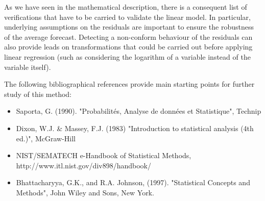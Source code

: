             {
              As we have seen in the mathematical description, there is a consequent list of verifications that have to be carried to validate the linear model. In particular, underlying assumptions on the residuals are important to ensure the robustness of the average forecast. Detecting a non-conform behaviour of the residuals can also provide leads on transformations that could be carried out before applying linear regression (such as considering the logarithm of a variable instead of the variable itself).

              The following bibliographical references provide main starting points for further study of this method:
              \begin{itemize}
              \item Saporta, G. (1990). "Probabilités, Analyse de données et Statistique", Technip
              \item Dixon, W.J. \& Massey, F.J. (1983) "Introduction to statistical analysis (4th ed.)", McGraw-Hill
              \item NIST/SEMATECH e-Handbook of Statistical Methods, http://www.itl.nist.gov/div898/handbook/
              \item Bhattacharyya, G.K., and R.A. Johnson, (1997). "Statistical Concepts and Methods", John Wiley and Sons, New York.
            \end{itemize}}
